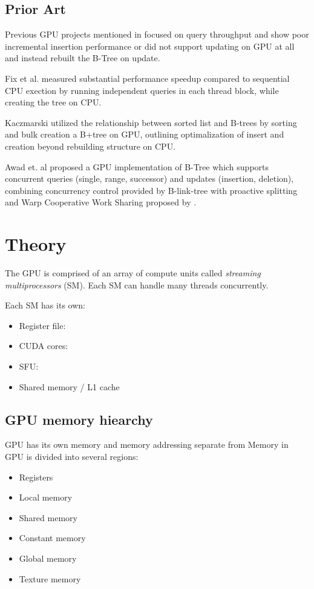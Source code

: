 \documentclass{article}
\begin{document}
\subsection{Prior Art}

Previous GPU projects mentioned in \cite{awad} focused on query throughput and show poor incremental insertion performance or did not support updating on GPU at all and instead rebuilt the B-Tree on update.

Fix et al. \cite{fix2011accelerating} measured substantial performance speedup compared to sequential CPU exection by running independent queries in each thread block, while creating the tree on CPU.

Kaczmarski \cite{kaczmarski} utilized the relationship between sorted list and B-trees by sorting and bulk creation a B+tree on GPU, outlining optimalization of insert and creation beyond rebuilding structure on CPU.

Awad et. al \cite{awad} proposed a GPU implementation of B-Tree which supports concurrent queries (single, range, successor) and updates (insertion, deletion), combining concurrency control provided by B-link-tree with proactive splitting and Warp Cooperative Work Sharing proposed by \cite{ashkiani2018dynamic}.


\section{Theory}

The GPU is comprised of an array of compute units called \textit{streaming multiprocessors} (SM). Each SM can handle many threads concurrently.

Each SM has its own:

\begin{itemize}
    \item Register file:
    \item CUDA cores:
    \item SFU:
    \item Shared memory / L1 cache
\end{itemize}

\subsection{GPU memory hiearchy}

GPU has its own memory and memory addressing separate from
Memory in GPU is divided into several regions:

\begin{itemize}
    \item Registers
    \item Local memory
    \item Shared memory
    \item Constant memory
    \item Global memory
    \item Texture memory
\end{itemize}
\end{document}
